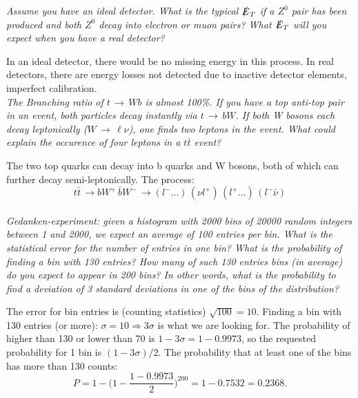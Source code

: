 \documentclass{article}
\begin{document}
\textit{Assume you have an ideal detector. What is the typical $\slashed{E}_T$ if a $Z^0$ pair has been produced and both $Z^0$ decay into electron or muon pairs? What $\slashed{E}_T$ will you expect when you have a real detector?}\\
\par In an ideal detector, there would be no missing energy in this process. In real detectors, there are energy losses not detected due to inactive detector elements, imperfect calibration.\\[14pt]
\textit{The Branching ratio of $t \, \rightarrow \, Wb$ is almost 100\%. If you have a top anti-top pair in an event, both particles decay instantly via $t \, \rightarrow \, bW$. If both W bosons each decay leptonically ($W \, \rightarrow \, \ell \nu$), one finds two leptons in the event. What could explain the occurence of four leptons in a $t \bar{t}$ event?}\\
\par The two top quarks can decay into b quarks and W bosons, both of which can further decay semi-leptonically. The process: 
\begin{equation}
t \bar{t} \, \rightarrow bW^+ \, \bar{b}W^- \, \rightarrow (l^- \ldots ) \, (\nu l^+) \, (l^+ \ldots) \, (l^- \bar{\nu})\nonumber
\end{equation}\\
\textit{Gedanken-experiment: given a histogram with 2000 bins of 20000 random integers between 1 and 2000, we expect an average of 100 entries per bin. What is the statistical error for the number of entries in one bin? What is the probability of finding a bin with 130 entries? How many of such 130 entries bins (in average) do you expect to appear in 200 bins? In other words, what is the probability to find a deviation of 3 standard deviations in one of the bins of the distribution?}\\
\par The error for bin entries is (counting statistics) $\sqrt{100} = 10$. Finding a bin with 130 entries (or more): $\sigma = 10 \Rightarrow 3\sigma$ is what we are looking for. The probability of higher than 130 or lower than 70 is $ 1- 3 \sigma = 1-0.9973$, so the requested probability for 1 bin is $(1-3\sigma)/2$. The probability that at least one of the bins has more than 130 counts:
\begin{equation}
P = 1 - \Big( 1 - \frac{1- 0.9973}{2} \Big)^{200} = 1-0.7532 = 0.2368.
\end{equation} 
\end{document}
